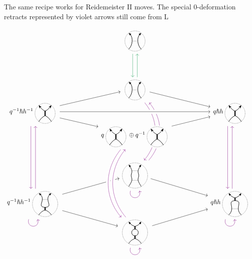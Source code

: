 \documentclass{article}
\theoremstyle{plain} %
\theoremstyle{definition} %
\theoremstyle{remark} %
\begin{document}
The same recipe works for Reidemeister II moves. The special 0-deformation retracts represented by violet arrows still come from L

\[\label{r2asdr}
\begin{tikzcd}[row sep=-0.1cm, column sep=2cm]
&
\scalebox{0.7}{\ThinEdge{}{}{}{}}
\arrow[d, color=ForestGreen, shift right=1.5]
&
\\[4em]&
\scalebox{0.7}{\ThinEdge{}{}{}{}}
\arrow[dr]
\arrow[ddd, bend left=40, color=violet, shift right=1.5, dash pattern=on 40pt off 35pt]
\arrow[leftarrow, ddd, bend left=40, color=violet, shift left=1.5, dash pattern=on 39.5pt off 37pt]
\arrow[u, color=ForestGreen, shift right=1.5]
&
\\
q^{-1}\hslash h^{-1}\scalebox{0.7}{\ThickEdge{}{}{}{}} 
\arrow[dr]
\arrow[ur]
\arrow[ddd, color=violet, shift right=1.5]
&
&
q\hslash h\scalebox{0.7}{\ThickEdge{}{}{}{}}
\arrow[ddd, color=violet, shift right=1.5]
\\
& 
q\scalebox{0.7}{\ThickEdge{}{}{}{}}\oplus q^{-1}\scalebox{0.7}{\ThickEdge{}{}{}{}}
\arrow[ur, crossing over] 
&
\\[2em]
& 
\scalebox{0.7}{\ThinThin{}{}{}{}{}}
\arrow[loop right, distance=1.5em, in=-75, out=-105, color=violet]
\arrow[dr]
&
\\
q^{-1}\hslash h^{-1}\scalebox{0.7}{\ThinThick{}{}{}{}{}} 
\arrow[loop right, distance=1.5em, in=-75, out=-105, color=violet]
\arrow[ur]
\arrow[dr]
\arrow[uuu, color=violet, shift right=1.5]
&& 
q\hslash h\scalebox{0.7}{\ThickThin{}{}{}{}{}}
\arrow[uuu, color=violet, shift right=1.5]
\arrow[loop right, distance=1.5em, in=-75, out=-105, color=violet]
\\
& 
\scalebox{0.7}{\Bigon{}{}{}{}{}} 
\arrow[ur]
\arrow[loop right, distance=1.5em, in=-75, out=-105, color=violet] 
&
\arrow[ddd, from=4-2, to=7-2, bend right=40, crossing over, color=violet, shift right=1.5] 
\arrow[uuu, from=7-2, to=4-2, bend left=40, crossing over, color=violet, shift right=1.5] 
\arrow[ur, from=4-2, to=3-3, crossing over] 
\arrow[rr, from=3-1, to=3-3, crossing over] 
\end{tikzcd}
\]
\end{document}
